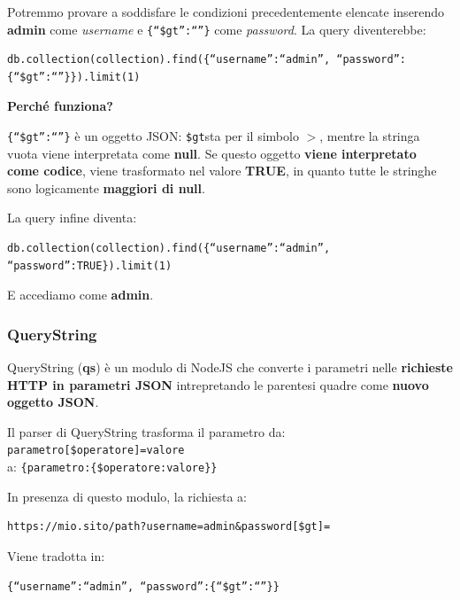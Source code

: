 \documentclass{article}
\begin{document}
Potremmo provare a soddisfare le condizioni precedentemente elencate inserendo \textbf{admin} come \textit{username} e \verb|{“$gt”:“”}| come \textit{password}. La query diventerebbe:
\begin{verbatim}
db.collection(collection).find({“username”:“admin”, “password”:{“$gt”:“”}}).limit(1)
\end{verbatim}

\textbf{Perché funziona?}

\verb|{“$gt”:“”}| è un oggetto JSON: \verb|$gt|sta per il simbolo $>$, mentre la stringa vuota viene interpretata come \textbf{null}. Se questo oggetto \textbf{viene interpretato come codice}, viene trasformato nel valore \textbf{TRUE}, in quanto tutte le stringhe sono logicamente \textbf{maggiori di null}.

La query infine diventa:
\begin{verbatim}
db.collection(collection).find({“username”:“admin”, “password”:TRUE}).limit(1) 
\end{verbatim}
E accediamo come \textbf{admin}.

\subsubsection{QueryString}
QueryString (\textbf{qs}) è un modulo di NodeJS che converte  i parametri nelle \textbf{richieste HTTP in parametri JSON} intrepretando le parentesi quadre come \textbf{nuovo oggetto JSON}.

Il parser di QueryString trasforma il parametro da:
\verb|parametro[$operatore]=valore| \\a:
\verb|{parametro:{$operatore:valore}}|

In presenza di questo modulo, la richiesta a:
\begin{verbatim}
https://mio.sito/path?username=admin&password[$gt]=
\end{verbatim}
Viene tradotta in:
\begin{verbatim}
{“username”:“admin”, “password”:{“$gt”:“”}}
\end{verbatim}
\end{document}
